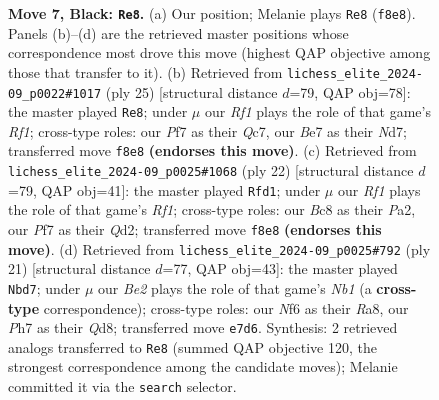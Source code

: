 \documentclass[11pt]{article}
\begin{document}
\begin{figure}[p]
\caption{\textbf{Move 7, Black: \texttt{Re8}.} (a) Our position; Melanie plays \texttt{Re8} (\texttt{f8e8}). Panels (b)--(d) are the retrieved master positions whose correspondence most drove this move (highest QAP objective among those that transfer to it). (b) Retrieved from \texttt{lichess\_elite\_2024-09\_p0022\#1017} (ply 25) [structural distance $d$=79, QAP obj=78]: the master played \texttt{Re8}; under $\mu$ our \emph{Rf1} plays the role of that game's \emph{Rf1}; cross-type roles: our \emph{P}f7 as their \emph{Q}c7, our \emph{B}e7 as their \emph{N}d7; transferred move \texttt{f8e8} \textbf{(endorses this move)}. (c) Retrieved from \texttt{lichess\_elite\_2024-09\_p0025\#1068} (ply 22) [structural distance $d$=79, QAP obj=41]: the master played \texttt{Rfd1}; under $\mu$ our \emph{Rf1} plays the role of that game's \emph{Rf1}; cross-type roles: our \emph{B}c8 as their \emph{P}a2, our \emph{P}f7 as their \emph{Q}d2; transferred move \texttt{f8e8} \textbf{(endorses this move)}. (d) Retrieved from \texttt{lichess\_elite\_2024-09\_p0025\#792} (ply 21) [structural distance $d$=77, QAP obj=43]: the master played \texttt{Nbd7}; under $\mu$ our \emph{Be2} plays the role of that game's \emph{Nb1} (a \textbf{cross-type} correspondence); cross-type roles: our \emph{N}f6 as their \emph{R}a8, our \emph{P}h7 as their \emph{Q}d8; transferred move \texttt{e7d6}. Synthesis: 2 retrieved analogs transferred to \texttt{Re8} (summed QAP objective 120, the strongest correspondence among the candidate moves); Melanie committed it via the \texttt{search} selector.}
\label{fig:thought-m13}
\end{figure}

\clearpage
\end{document}
